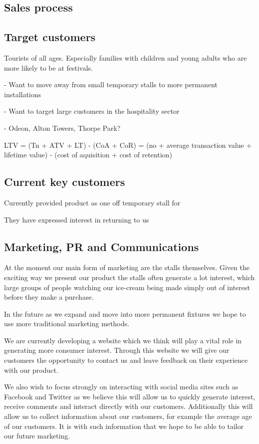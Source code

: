 \documentclass{article}
\begin{document}
  \subsection{Sales process}

  \subsection{Target customers}
Tourists of all ages. Especially families with children and young adults
who are more likely to be at festivals.

 - Want to move away from small temporary stalls to more permanent
installations

 - Want to target large customers in the hospitality sector

 - Odeon, Alton Towers, Thorpe Park?

   LTV = (Tn + ATV + LT) - (CoA + CoR)
       = (no + average transaction value + lifetime value) - (cost of aquisition + cost of retention) 

  \subsection{Current key customers}

  Currently provided product as one off temporary stall for 

  They have expressed interest in returning to us

  \subsection{Marketing, PR and Communications}
  At the moment our main form of marketing are the stalls themselves. Given the exciting way we present our product the stalls often generate a lot interest, which large groups of people watching our ice-cream being made simply out of interest before they make a purchase.

  In the future as we expand and move into more permanent fixtures we hope to use more traditional marketing methods.

  We are currently developing a website which we think will play a vital role in generating more consumer interest. Through this website we will give our customers the opportunity to contact us and leave feedback on their experience with our product.

  We also wish to focus strongly on interacting with social media sites such as Facebook and Twitter as we believe this will allow us to quickly generate interest, receive comments and interact directly with our customers. Additionally this will allow us to collect information about our customers, for example the average age of our customers. It is with such information that we hope to be able to tailor our future marketing.
\end{document}
